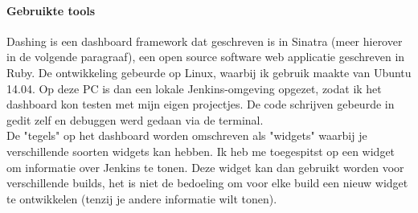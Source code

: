 \documentclass[10pt,a4paper]{article}
\begin{document}
\paragraph{Gebruikte tools}
Dashing is een dashboard framework dat geschreven is in Sinatra (meer hierover in de volgende paragraaf), een open source software web applicatie geschreven in Ruby. De ontwikkeling gebeurde op Linux, waarbij ik gebruik maakte van Ubuntu 14.04. Op deze PC is dan een lokale Jenkins-omgeving opgezet, zodat ik het dashboard kon testen met mijn eigen projectjes. De code schrijven gebeurde in gedit zelf en debuggen werd gedaan via de terminal.  \\
De "tegels" op het dashboard worden omschreven als "widgets" waarbij je verschillende soorten widgets kan hebben. Ik heb me toegespitst op een widget om informatie over Jenkins te tonen. Deze widget kan dan gebruikt worden voor verschillende builds, het is niet de bedoeling om voor elke build een nieuw widget te ontwikkelen (tenzij je andere informatie wilt tonen).
\end{document}
